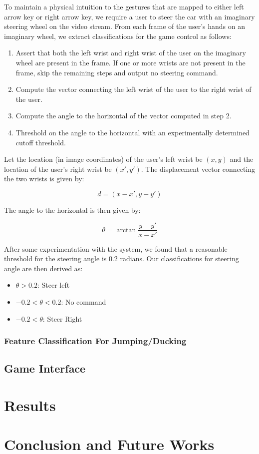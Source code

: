 \documentclass[10pt,twocolumn,letterpaper]{article}
\begin{document}
To maintain a physical intuition to the gestures that are mapped to either 
left arrow key or right arrow key, we require a user to steer the car with 
an imaginary steering wheel on the video stream. From each frame of the user's 
hands on an imaginary wheel, we extract classifications for the game control 
as follows:

\begin{enumerate}
    \item Assert that both the left wrist and right wrist of the user on the 
        imaginary wheel are present in the frame. If one or more wrists are 
        not present in the frame, skip the remaining steps and output no 
        steering command.
    \item Compute the vector connecting the left wrist of the user to the 
        right wrist of the user.
    \item Compute the angle to the horizontal of the vector computed in step 2.
    \item Threshold on the angle to the horizontal with an experimentally 
        determined cutoff threshold.
\end{enumerate}

Let the location (in image coordinates) of the user's left wrist be $(x,y)$ and 
the location of the user's right wrist be $(x', y')$. The displacement vector 
connecting the two wrists is given by:

$$d = (x - x', y - y')$$

The angle to the horizontal is then given by:

$$\theta = \arctan{\frac{y-y'}{x-x'}}$$

After some experimentation with the system, we found that a reasonable threshold 
for the steering angle is $0.2$ radians. Our classifications for steering angle 
are then derived as:

\begin{itemize}
    \item $\theta > 0.2$: Steer left
    \item $-0.2 < \theta < 0.2$: No command
    \item $-0.2 < \theta$: Steer Right
\end{itemize}

\subsubsection{Feature Classification For Jumping/Ducking} 

\subsection{Game Interface}

\section{Results}

\section{Conclusion and Future Works}

{\small


}
\end{document}
